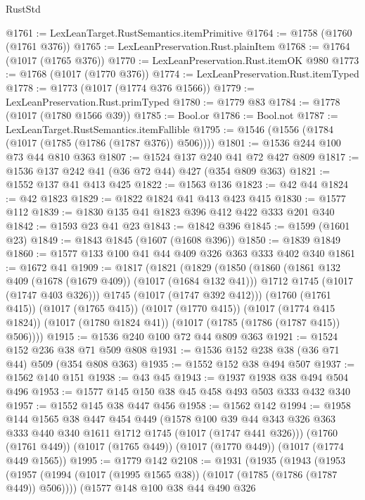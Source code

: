 \begin{lexlean}{RustStd}
\begin{coremodule}
@1761 := LexLeanTarget.RustSemantics.itemPrimitive
@1764 := @1758 (@1760 (@1761 @376))
@1765 := LexLeanPreservation.Rust.plainItem
@1768 := @1764 (@1017 (@1765 @376))
@1770 := LexLeanPreservation.Rust.itemOK @980
@1773 := @1768 (@1017 (@1770 @376))
@1774 := LexLeanPreservation.Rust.itemTyped
@1778 := @1773 (@1017 (@1774 @376 @1566))
@1779 := LexLeanPreservation.Rust.primTyped
@1780 := @1779 @83
@1784 := @1778 (@1017 (@1780 @1566 @39))
@1785 := Bool.or
@1786 := Bool.not
@1787 := LexLeanTarget.RustSemantics.itemFallible
@1795 := @1546 (@1556 (@1784 (@1017 (@1785 (@1786 (@1787 @376)) @506))))
@1801 := @1536 @244 @100 @73 @44 @810 @363
@1807 := @1524 @137 @240 @41 @72 @427 @809
@1817 := @1536 @137 @242 @41 (@36 @72 @44) @427 (@354 @809 @363)
@1821 := @1552 @137 @41 @413 @425
@1822 := @1563 @136
@1823 := @42 @44
@1824 := @42 @1823
@1829 := @1822 @1824 @41 @413 @423 @415
@1830 := @1577 @112
@1839 := @1830 @135 @41 @1823 @396 @412 @422 @333 @201 @340
@1842 := @1593 @23 @41 @23
@1843 := @1842 @396
@1845 := @1599 (@1601 @23)
@1849 := @1843 @1845 (@1607 (@1608 @396))
@1850 := @1839 @1849
@1860 := @1577 @133 @100 @41 @44 @409 @326 @363 @333 @402 @340
@1861 := @1672 @41
@1909 := @1817
    (@1821
      (@1829
        (@1850
          (@1860
            (@1861 @132 @409 (@1678 (@1679 @409)) (@1017 (@1684 @132 @41)))
            @1712
            @1745
            (@1017 (@1747 @403 @326)))
          @1745
          (@1017 (@1747 @392 @412)))
        (@1760 (@1761 @415))
        (@1017 (@1765 @415))
        (@1017 (@1770 @415))
        (@1017 (@1774 @415 @1824))
        (@1017 (@1780 @1824 @41))
        (@1017 (@1785 (@1786 (@1787 @415)) @506))))
@1915 := @1536 @240 @100 @72 @44 @809 @363
@1921 := @1524 @152 @236 @38 @71 @509 @808
@1931 := @1536 @152 @238 @38 (@36 @71 @44) @509 (@354 @808 @363)
@1935 := @1552 @152 @38 @494 @507
@1937 := @1562 @140 @151
@1938 := @43 @45
@1943 := @1937 @1938 @38 @494 @504 @496
@1953 := @1577 @145 @150 @38 @45 @458 @493 @503 @333 @432 @340
@1957 := @1552 @145 @38 @447 @456
@1958 := @1562 @142
@1994 := @1958
    @144
    @1565
    @38
    @447
    @454
    @449
    (@1578 @100 @39 @44 @343 @326 @363 @333 @440 @340 @1611 @1712 @1745 (@1017 (@1747 @441 @326)))
    (@1760 (@1761 @449))
    (@1017 (@1765 @449))
    (@1017 (@1770 @449))
    (@1017 (@1774 @449 @1565))
@1995 := @1779 @142
@2108 := @1931
    (@1935
      (@1943
        (@1953
          (@1957 (@1994 (@1017 (@1995 @1565 @38)) (@1017 (@1785 (@1786 (@1787 @449)) @506))))
          (@1577
            @148
            @100
            @38
            @44
            @490
            @326

\end{coremodule}
\end{lexlean}
